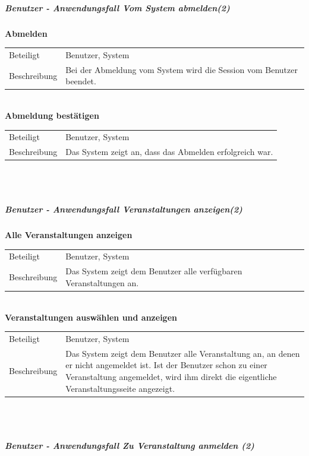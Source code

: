 \documentclass[12pt,a4paper]{article}
\begin{document}
\subparagraph{Benutzer - Anwendungsfall \glqq Vom System abmelden\grqq (2)}\mbox{}

\textbf{Abmelden}\\
\begin{tabular}{l|p{12cm}}
\hline 
Beteiligt & Benutzer, System \\ 
Beschreibung & Bei der Abmeldung vom System wird die Session vom Benutzer beendet.\\ 
\end{tabular}\\

\textbf{Abmeldung bestätigen}\\
\begin{tabular}{l|p{12cm}}
\hline 
Beteiligt & Benutzer, System \\ 
Beschreibung &  Das System zeigt an, dass das Abmelden erfolgreich war. \\ 
\end{tabular}\\\\



\subparagraph{Benutzer - Anwendungsfall \glqq Veranstaltungen anzeigen\grqq (2)}\mbox{}

\textbf{Alle Veranstaltungen anzeigen}\\
\begin{tabular}{l|p{12cm}}
\hline 
Beteiligt & Benutzer, System  \\ 
Beschreibung & Das System zeigt dem Benutzer alle verfügbaren Veranstaltungen an. \\ 
\end{tabular}\\ 

\textbf{Veranstaltungen auswählen und anzeigen}\\
\begin{tabular}{l|p{12cm}}
\hline 
Beteiligt & Benutzer, System \\ 
Beschreibung & Das System zeigt dem Benutzer alle Veranstaltung an, an denen er nicht angemeldet ist. Ist der Benutzer schon zu einer Veranstaltung angemeldet, wird ihm direkt die eigentliche Veranstaltungsseite angezeigt. \\ 
\end{tabular} \\\\

\newpage

\subparagraph{Benutzer - Anwendungsfall \glqq Zu Veranstaltung anmelden \grqq (2)}\mbox{}
\end{document}
